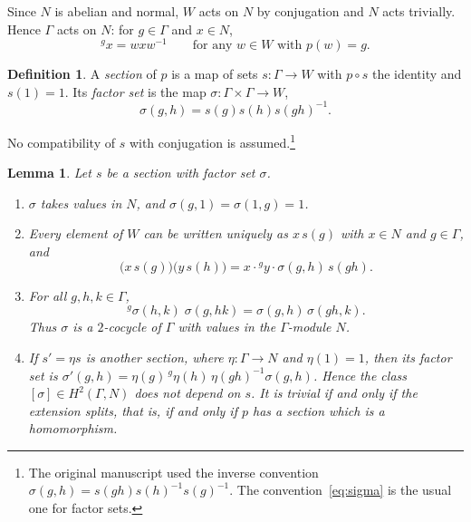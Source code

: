 \documentclass[12pt,letterpaper]{article}
\numberwithin{equation}{section}
\theoremstyle{plain}
\newtheorem{lemma}[theorem]{Lemma}
\theoremstyle{definition}
\newtheorem{definition}[theorem]{Definition}
\newcommand{\act}[2]{{}^{#1}\!#2}          %
\begin{document}
Since $N$ is abelian and normal, $W$ acts on $N$ by conjugation and $N$
acts trivially. Hence $\Gamma$ acts on $N$: for $g\in\Gamma$ and $x\in N$,
\begin{equation}\label{eq:actN}
\act{g}{x}=wxw^{-1}\qquad\text{for any } w\in W \text{ with } p(w)=g .
\end{equation}

\begin{definition}\label{def:section}
A \emph{section} of $p$ is a map of sets $s:\Gamma\to W$ with $p\circ s$
the identity and $s(1)=1$. Its \emph{factor set} is the map
$\sigma:\Gamma\times\Gamma\to W$,
\begin{equation}\label{eq:sigma}
\sigma(g,h)=s(g)s(h)s(gh)^{-1}.
\end{equation}
\end{definition}

No compatibility of $s$ with conjugation is assumed.\footnote{The original
manuscript used the inverse convention
$\sigma(g,h)=s(gh)s(h)^{-1}s(g)^{-1}$. The convention~\eqref{eq:sigma} is
the usual one for factor sets.}

\begin{lemma}\label{lem:factor}
Let $s$ be a section with factor set $\sigma$.
\begin{enumerate}[label=\textup{(\roman*)},itemsep=1pt]
\item $\sigma$ takes values in $N$, and $\sigma(g,1)=\sigma(1,g)=1$.
\item Every element of $W$ can be written uniquely as $x\,s(g)$ with
$x\in N$ and $g\in\Gamma$, and
\begin{equation}\label{eq:mult}
\bigl(x\,s(g)\bigr)\bigl(y\,s(h)\bigr)=x\cdot\act{g}{y}\cdot\sigma(g,h)\,s(gh).
\end{equation}
\item For all $g,h,k\in\Gamma$,
\begin{equation}\label{eq:2coc}
\act{g}{\sigma(h,k)}\;\sigma(g,hk)=\sigma(g,h)\,\sigma(gh,k).
\end{equation}
Thus $\sigma$ is a $2$-cocycle of $\Gamma$ with values in the
$\Gamma$-module $N$.
\item If $s'=\eta s$ is another section, where $\eta:\Gamma\to N$ and
$\eta(1)=1$, then its factor set is
$\sigma'(g,h)=\eta(g)\,\act{g}{\eta(h)}\,\eta(gh)^{-1}\sigma(g,h)$. Hence
the class $[\sigma]\in H^2(\Gamma,N)$ does not depend on $s$. It is trivial
if and only if the extension splits, that is, if and only if $p$ has a
section which is a homomorphism.
\end{enumerate}
\end{lemma}
\end{document}
